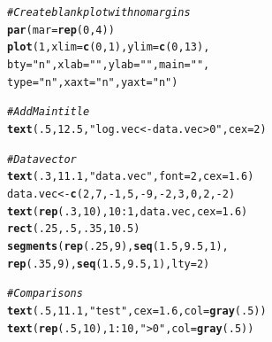 \documentclass{tufte-book}\usepackage[]{graphicx}\usepackage[]{color}
\makeatletter
\newcommand{\hlnum}[1]{\textcolor[rgb]{0.686,0.059,0.569}{#1}}%
\newcommand{\hlstr}[1]{\textcolor[rgb]{0.192,0.494,0.8}{#1}}%
\newcommand{\hlcom}[1]{\textcolor[rgb]{0.678,0.584,0.686}{\textit{#1}}}%
\newcommand{\hlopt}[1]{\textcolor[rgb]{0,0,0}{#1}}%
\newcommand{\hlstd}[1]{\textcolor[rgb]{0.345,0.345,0.345}{#1}}%
\newcommand{\hlkwb}[1]{\textcolor[rgb]{0.69,0.353,0.396}{#1}}%
\newcommand{\hlkwc}[1]{\textcolor[rgb]{0.333,0.667,0.333}{#1}}%
\newcommand{\hlkwd}[1]{\textcolor[rgb]{0.737,0.353,0.396}{\textbf{#1}}}%
\newenvironment{kframe}{%
 \def\at@end@of@kframe{}%
 \ifinner\ifhmode%
  \def\at@end@of@kframe{\end{minipage}}%
  \begin{minipage}{\columnwidth}%
 \fi\fi%
 \def\FrameCommand##1{\hskip\@totalleftmargin \hskip-\fboxsep
 \colorbox{shadecolor}{##1}\hskip-\fboxsep
     \hskip-\linewidth \hskip-\@totalleftmargin \hskip\columnwidth}%
 \MakeFramed {\advance\hsize-\width
   \@totalleftmargin\z@ \linewidth\hsize
   \@setminipage}}%
 {\par\unskip\endMakeFramed%
 \at@end@of@kframe}
\newenvironment{knitrout}{}{} %
\makeatother
\begin{document}
\begin{footnotesize}
\begin{marginfigure}
\begin{tiny}
\begin{knitrout}
\color{fgcolor}\begin{kframe}
\begin{alltt}
\hlcom{# Create blank plot with no margins}
\hlkwd{par}\hlstd{(}\hlkwc{mar} \hlstd{=} \hlkwd{rep}\hlstd{(}\hlnum{0}\hlstd{,} \hlnum{4}\hlstd{))}
\hlkwd{plot}\hlstd{(}\hlnum{1}\hlstd{,} \hlkwc{xlim} \hlstd{=} \hlkwd{c}\hlstd{(}\hlnum{0}\hlstd{,} \hlnum{1}\hlstd{),} \hlkwc{ylim} \hlstd{=} \hlkwd{c}\hlstd{(}\hlnum{0}\hlstd{,} \hlnum{13}\hlstd{),}
     \hlkwc{bty} \hlstd{=} \hlstr{"n"}\hlstd{,} \hlkwc{xlab} \hlstd{=} \hlstr{""}\hlstd{,} \hlkwc{ylab} \hlstd{=} \hlstr{""}\hlstd{,} \hlkwc{main} \hlstd{=} \hlstr{""}\hlstd{,}
     \hlkwc{type} \hlstd{=} \hlstr{"n"}\hlstd{,} \hlkwc{xaxt} \hlstd{=} \hlstr{"n"}\hlstd{,} \hlkwc{yaxt} \hlstd{=} \hlstr{"n"}\hlstd{)}

\hlcom{# Add Main title}
\hlkwd{text}\hlstd{(}\hlnum{.5}\hlstd{,} \hlnum{12.5}\hlstd{,} \hlstr{"log.vec <- data.vec > 0"}\hlstd{,} \hlkwc{cex} \hlstd{=} \hlnum{2}\hlstd{)}

\hlcom{# Data vector}
\hlkwd{text}\hlstd{(}\hlnum{.3}\hlstd{,} \hlnum{11.1}\hlstd{,} \hlstr{"data.vec"}\hlstd{,} \hlkwc{font} \hlstd{=} \hlnum{2}\hlstd{,} \hlkwc{cex} \hlstd{=} \hlnum{1.6}\hlstd{)}
\hlstd{data.vec} \hlkwb{<-} \hlkwd{c}\hlstd{(}\hlnum{2}\hlstd{,} \hlnum{7}\hlstd{,} \hlopt{-}\hlnum{1}\hlstd{,} \hlnum{5}\hlstd{,} \hlopt{-}\hlnum{9}\hlstd{,} \hlopt{-}\hlnum{2}\hlstd{,} \hlnum{3}\hlstd{,} \hlnum{0}\hlstd{,} \hlnum{2}\hlstd{,} \hlopt{-}\hlnum{2}\hlstd{)}
\hlkwd{text}\hlstd{(}\hlkwd{rep}\hlstd{(}\hlnum{.3}\hlstd{,} \hlnum{10}\hlstd{),} \hlnum{10}\hlopt{:}\hlnum{1}\hlstd{, data.vec,} \hlkwc{cex} \hlstd{=} \hlnum{1.6}\hlstd{)}
\hlkwd{rect}\hlstd{(}\hlnum{.25}\hlstd{,} \hlnum{.5}\hlstd{,} \hlnum{.35}\hlstd{,} \hlnum{10.5}\hlstd{)}
\hlkwd{segments}\hlstd{(}\hlkwd{rep}\hlstd{(}\hlnum{.25}\hlstd{,} \hlnum{9}\hlstd{),} \hlkwd{seq}\hlstd{(}\hlnum{1.5}\hlstd{,} \hlnum{9.5}\hlstd{,} \hlnum{1}\hlstd{),}
         \hlkwd{rep}\hlstd{(}\hlnum{.35}\hlstd{,} \hlnum{9}\hlstd{),} \hlkwd{seq}\hlstd{(}\hlnum{1.5}\hlstd{,} \hlnum{9.5}\hlstd{,} \hlnum{1}\hlstd{),} \hlkwc{lty} \hlstd{=} \hlnum{2}\hlstd{)}


\hlcom{# Comparisons}
\hlkwd{text}\hlstd{(}\hlnum{.5}\hlstd{,} \hlnum{11.1}\hlstd{,} \hlstr{"test"}\hlstd{,} \hlkwc{cex} \hlstd{=} \hlnum{1.6}\hlstd{,} \hlkwc{col} \hlstd{=} \hlkwd{gray}\hlstd{(}\hlnum{.5}\hlstd{))}
\hlkwd{text}\hlstd{(}\hlkwd{rep}\hlstd{(}\hlnum{.5}\hlstd{,} \hlnum{10}\hlstd{),} \hlnum{1}\hlopt{:}\hlnum{10}\hlstd{,} \hlstr{"> 0"}\hlstd{,} \hlkwc{col} \hlstd{=} \hlkwd{gray}\hlstd{(}\hlnum{.5}\hlstd{))}


\end{alltt}
\end{kframe}
\end{knitrout}
\end{tiny}
\end{marginfigure}
\end{footnotesize}
\end{document}

